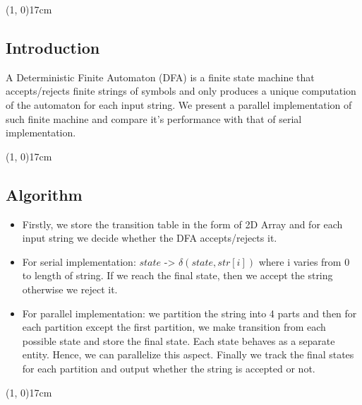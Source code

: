 \documentclass[10pt]{article}
\begin{document}
\begin{center}
	\line(1, 0){17cm}
\end{center}

\begin{center}
 \section*{Introduction}
 \end{center}
 
A Deterministic Finite Automaton (DFA) is a finite state machine that accepts/rejects finite strings of symbols and only produces a unique computation of the automaton for each input string. We present a parallel implementation of such finite machine and compare it's performance with that of serial implementation.

\begin{center}
	\line(1, 0){17cm}
\end{center}

\begin{center}
  \section*{Algorithm}
\end{center}

 
\begin{itemize}
\item Firstly, we store the transition table in the form of 2D Array and for each input string we decide whether the DFA accepts/rejects it. 

\item For serial implementation: $state$ -> $\delta(state,str[i])$ where i varies from 0 to length of string. If we reach the final state, then we accept the string otherwise we reject it.  

\item For parallel implementation: we partition the string into 4 parts and then for each partition except the first partition, we make transition from each possible state and store the final state. Each state behaves as a separate entity. Hence, we can parallelize this aspect. Finally we track the final states for each partition and output whether the string is accepted or not. 
   
\end{itemize}

\begin{center}
	\line(1, 0){17cm}
\end{center}
\end{document}
